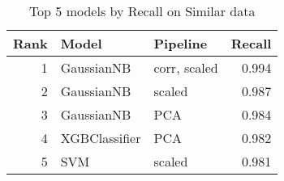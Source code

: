 \begin{table}[!htb]
\caption{Top 5 models by Recall on Similar data}
\label{table-top-5-recall-similar}
\centering
\begin{tabular}{rllr}
\toprule
Rank & Model & Pipeline & Recall \\
\midrule
1 & GaussianNB & corr, scaled & 0.994 \\
2 & GaussianNB & scaled & 0.987 \\
3 & GaussianNB & PCA & 0.984 \\
4 & XGBClassifier & PCA & 0.982 \\
5 & SVM & scaled & 0.981 \\
\bottomrule
\end{tabular}
\end{table}

